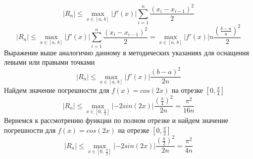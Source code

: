 \documentclass[a5paper, 10pt]{article}
\theoremstyle{definition}
\theoremstyle{plain}
\theoremstyle{remark}
\begin{document}
\begin{equation}
\left|R_n\right| \leqslant  \max\limits_{x \in [a,\,b]} \left|f'(x)\right|  \sum\limits_{i=1}^n  \frac {(x_i - x_{i-1})^2}{2} 
\end{equation}
\begin{equation}
\left|R_n\right| \leqslant \max\limits_{x \in [a,\,b]} \left|f'(x)\right|  \sum\limits_{i=1}^n  \frac {(x_i - x_{i-1})^2}{2} = \max\limits_{x \in [a,\,b]} \left|f'(x)\right|   n \frac {(\frac{b - a}{n})^2}{2}
\end{equation}
Выражение выше аналогично данному в методических указаниях для оснащения левыми или правыми точками
\begin{equation}
\left|R_n\right| \leqslant \max\limits_{x \in [a,\,b]} \left|f'(x)\right|  \frac {(b - a)^2}{2n}
\end{equation}
Найдем значение погрешности для $f(x) = cos(2x)$ на отрезке $[0, \frac{\pi}{4}]$
\begin{equation}
\left|R_n\right| \leqslant \max\limits_{x \in [0,\, \frac{\pi}{4}]} \left| -2sin(2x)\right|  \frac {(\frac{\pi}{4})^2}{2n} = \frac {\pi^2}{16n}
\end{equation}
Вернемся к рассмотрению функции по полном отрезке и найдем значение погрешности для $f(x) = cos(2x)$ на отрезке $[0, \frac{\pi}{2}]$
\begin{equation}
\left|R_n\right| \leqslant \max\limits_{x \in [0,\, \frac{\pi}{2}]} \left| -2sin(2x)\right|  \frac {(\frac{\pi}{2})^2}{2n} = \frac {\pi^2}{4n}
\end{equation}
\end{document}
